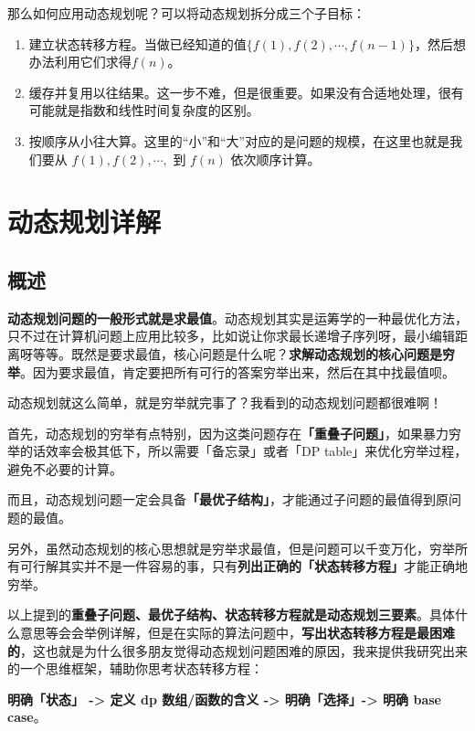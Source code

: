 \documentclass[12pt]{article}
\begin{document}
那么如何应用动态规划呢？可以将动态规划拆分成三个子目标：

\begin{enumerate}[itemindent=2em]
    \item 建立状态转移方程。当做已经知道的值$\{f(1),f(2), \cdots, f(n-1)\}$，然后想办法利用它们求得$f(n)$。
    
    \item 缓存并复用以往结果。这一步不难，但是很重要。如果没有合适地处理，很有可能就是指数和线性时间复杂度的区别。

    \item 按顺序从小往大算。这里的“小”和“大”对应的是问题的规模，在这里也就是我们要从 $f(1), f(2), \cdots, $ 到 $f(n)$ 依次顺序计算。
\end{enumerate}

\section{动态规划详解\cite{F_Algorithm_Dynamic_Programming_Step}}
\subsection{概述}
\textbf{动态规划问题的一般形式就是求最值}。动态规划其实是运筹学的一种最优化方法，只不过在计算机问题上应用比较多，比如说让你求最长递增子序列呀，最小编辑距离呀等等。既然是要求最值，核心问题是什么呢？\textbf{求解动态规划的核心问题是穷举}。因为要求最值，肯定要把所有可行的答案穷举出来，然后在其中找最值呗。

动态规划就这么简单，就是穷举就完事了？我看到的动态规划问题都很难啊！

首先，动态规划的穷举有点特别，因为这类问题存在\textbf{「重叠子问题」}，如果暴力穷举的话效率会极其低下，所以需要「备忘录」或者「DP table」来优化穷举过程，避免不必要的计算。

而且，动态规划问题一定会具备\textbf{「最优子结构」}，才能通过子问题的最值得到原问题的最值。

另外，虽然动态规划的核心思想就是穷举求最值，但是问题可以千变万化，穷举所有可行解其实并不是一件容易的事，只有\textbf{列出正确的「状态转移方程」}才能正确地穷举。

以上提到的\textbf{重叠子问题、最优子结构、状态转移方程就是动态规划三要素}。具体什么意思等会会举例详解，但是在实际的算法问题中，\textbf{写出状态转移方程是最困难的}，这也就是为什么很多朋友觉得动态规划问题困难的原因，我来提供我研究出来的一个思维框架，辅助你思考状态转移方程：

\textbf{明确「状态」 -> 定义 dp 数组/函数的含义 -> 明确「选择」-> 明确 base case}。
\end{document}
